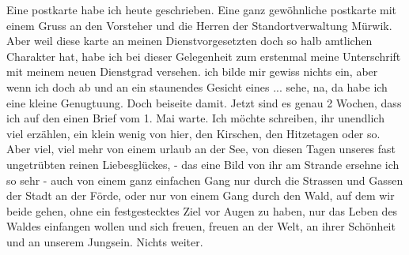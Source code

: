 \def\day{15. Juli 1943.}
\mktitle
Eine postkarte habe ich heute geschrieben.
Eine ganz gew\"{o}hnliche postkarte mit einem Gruss an den Vorsteher und die Herren der Standortverwaltung M\"{u}rwik.
Aber weil diese karte an meinen Dienstvorgesetzten doch so halb amtlichen Charakter hat, habe ich bei dieser Gelegenheit zum erstenmal meine Unterschrift mit meinem neuen Dienstgrad versehen.
ich bilde mir gewiss nichts ein, aber wenn ich doch ab und an ein staunendes Gesicht eines ... sehe, na, da habe ich eine kleine Genugtuung.
Doch beiseite damit.
Jetzt sind es genau 2 Wochen, dass ich auf den einen Brief vom 1. Mai warte.
Ich m\"{o}chte schreiben, ihr unendlich viel erz\"{a}hlen, ein klein wenig von hier, den Kirschen, den Hitzetagen oder so.
Aber viel, viel mehr von einem urlaub an der See, von diesen Tagen unseres fast ungetr\"{u}bten reinen Liebesgl\"{u}ckes, - das eine Bild von ihr am Strande ersehne ich so sehr - auch von einem ganz einfachen Gang nur durch die Strassen und Gassen der Stadt an der F\"{o}rde, oder nur von einem Gang durch den Wald, auf dem wir beide gehen, ohne ein festgestecktes Ziel vor Augen zu haben, nur das Leben des Waldes einfangen wollen und sich freuen, freuen an der Welt, an ihrer Sch\"{o}nheit und an unserem Jungsein.
Nichts weiter.

\clearpage
